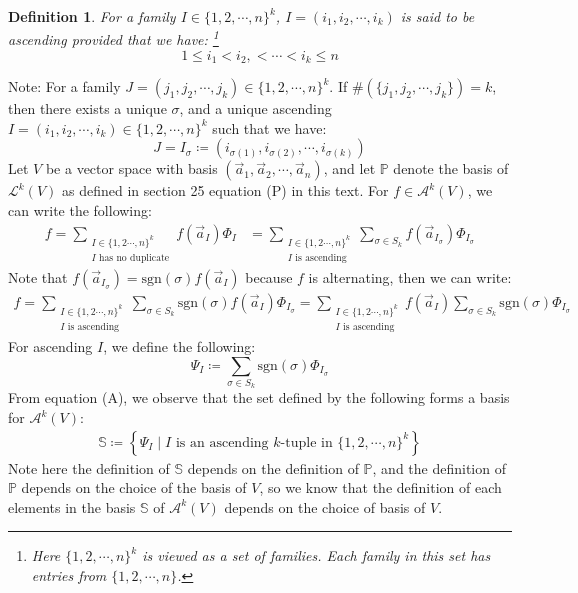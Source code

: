 \documentclass[11pt,oneside]{book}
\theoremstyle{break}
\theoremstyle{break}
\newtheorem{defn}{Definition}[corL]
\newcommand{\Lt}{\mathcal{L}}
\newcommand{\A}{\mathcal{A}}
\newcommand{\sgn}{\text{sgn}}
\newcommand{\note}{\color{red}Note: \color{black}}
\begin{document}
\begin{defn}
For a family $I \in \{1,2,\cdots, n\}^k$, $I=(i_1,i_2,\cdots, i_k)$ is said to be ascending provided that we have: \footnote{Here $\{1,2,\cdots, n\}^k$ is viewed as a set of families. Each family in this set has entries from $\{1,2,\cdots, n\}$.} $$1\leq i_1< i_2,<\cdots <i_k\leq n$$ 
\end{defn}
\hfill\break
\note For a family $J=(j_1,j_2,\cdots, j_k) \in \{1,2,\cdots, n\}^k$. If $\#(\{j_1,j_2,\cdots, j_k\}) = k$, then there exists a unique $\sigma$, and a unique ascending $I=(i_1,i_2,\cdots, i_k) \in \{1,2,\cdots, n\}^k$ such that we have:
$$J = I_\sigma  \coloneqq (i_{\sigma(1)}, i_{\sigma(2)},\cdots, i_{\sigma(k)}) $$
Let $V$ be a vector space with basis $(\vec{a}_1,\vec{a}_2, \cdots, \vec{a}_n)$, and let $\mathbb{P}$ denote the basis of $\Lt^k(V)$ as defined in section 25 equation (P) in this text. For $f \in \A^k(V)$, we can write the following:
\begin{align*}
f = \sum\limits_{\substack{I \in \{1,2\cdots,n\}^k \\ I \text{ has no duplicate}}} f(\vec{a}_I) \Phi_I &= \sum\limits_{\substack{I \in \{1,2\cdots,n\}^k \\ I \text{ is ascending}}} \sum_{\sigma \in S_k} f(\vec{a}_{I_\sigma}) \Phi_{I_\sigma}
\end{align*}
Note that $f(\vec{a}_{I_{\sigma}}) = \sgn(\sigma) f(\vec{a}_I)$ because $f$ is alternating, then we can write:
\begin{align*}
f =\sum\limits_{\substack{I \in \{1,2\cdots,n\}^k \\ I \text{ is ascending}}} \sum_{\sigma \in S_k} \sgn (\sigma) f(\vec{a}_{I}) \Phi_{I_\sigma} 
= \sum\limits_{\substack{I \in \{1,2\cdots,n\}^k \\ I \text{ is ascending}}} f(\vec{a}_{I}) \sum_{\sigma \in S_k} \sgn (\sigma)  \Phi_{I_\sigma} \tag{A}  
\end{align*}
For ascending $I$, we define the following: 
$$\Psi_{I}\coloneqq \sum_{\sigma \in S_k} \sgn(\sigma) \Phi_{I_{\sigma}}$$
From equation (A), we observe that the set defined by the following forms a basis for $\A^k(V)$:
\begin{align*}
\mathbb{S} \coloneqq \left\{ \Psi_{I} \mid I \text{ is an ascending }k\text{-tuple in }\{1, 2, \cdots, n\}^k\right\}
\end{align*}
Note here the definition of $\mathbb{S}$ depends on the definition of $\mathbb{P}$, and the definition of $\mathbb{P}$ depends on the choice of the basis of $V$, so we know that the definition of each elements in the basis $\mathbb{S}$ of $\A^k(V)$ depends on the choice of basis of $V$.\\
\end{document}
